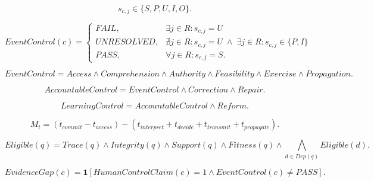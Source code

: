 
\[
s_{c,j}\in\{S,P,U,I,O\}.
\]

\[
EventControl(c)=
\begin{cases}
FAIL, & \exists j\in R:s_{c,j}=U\\
UNRESOLVED, & \nexists j\in R:s_{c,j}=U\;\land\;\exists j\in R:s_{c,j}\in\{P,I\}\\
PASS, & \forall j\in R:s_{c,j}=S.
\end{cases}
\]

\[
EventControl=Access\land Comprehension\land Authority\land Feasibility\land Exercise\land Propagation.
\]

\[
AccountableControl=EventControl\land Correction\land Repair.
\]

\[
LearningControl=AccountableControl\land Reform.
\]

\[
M_t=(t_{commit}-t_{access})-(t_{interpret}+t_{decide}+t_{transmit}+t_{propagate}).
\]

\[
Eligible(q)=Trace(q)\land Integrity(q)\land Support(q)\land Fitness(q)\land\bigwedge_{d\in Dep(q)}Eligible(d).
\]

\[
EvidenceGap(c)=\mathbf{1}[HumanControlClaim(c)=1\land EventControl(c)\neq PASS].
\]
